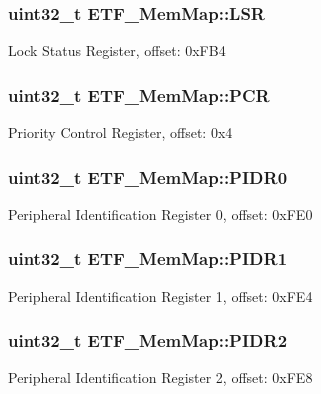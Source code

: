 \subsubsection[{L\+S\+R}]{\setlength{\rightskip}{0pt plus 5cm}uint32\+\_\+t E\+T\+F\+\_\+\+Mem\+Map\+::\+L\+S\+R}\label{struct_e_t_f___mem_map_a404d7b7ce01537cb61bbb7c2d2ec1de5}
Lock Status Register, offset\+: 0x\+F\+B4 \hypertarget{struct_e_t_f___mem_map_aa50938e7ba3b91d0bc8417397ef82267}{}
\subsubsection[{P\+C\+R}]{\setlength{\rightskip}{0pt plus 5cm}uint32\+\_\+t E\+T\+F\+\_\+\+Mem\+Map\+::\+P\+C\+R}\label{struct_e_t_f___mem_map_aa50938e7ba3b91d0bc8417397ef82267}
Priority Control Register, offset\+: 0x4 \hypertarget{struct_e_t_f___mem_map_a0ed9ad5240882ee853a4f4e8871c145f}{}
\subsubsection[{P\+I\+D\+R0}]{\setlength{\rightskip}{0pt plus 5cm}uint32\+\_\+t E\+T\+F\+\_\+\+Mem\+Map\+::\+P\+I\+D\+R0}\label{struct_e_t_f___mem_map_a0ed9ad5240882ee853a4f4e8871c145f}
Peripheral Identification Register 0, offset\+: 0x\+F\+E0 \hypertarget{struct_e_t_f___mem_map_a70c724eb6523bbe1eedd98c71922cf65}{}
\subsubsection[{P\+I\+D\+R1}]{\setlength{\rightskip}{0pt plus 5cm}uint32\+\_\+t E\+T\+F\+\_\+\+Mem\+Map\+::\+P\+I\+D\+R1}\label{struct_e_t_f___mem_map_a70c724eb6523bbe1eedd98c71922cf65}
Peripheral Identification Register 1, offset\+: 0x\+F\+E4 \hypertarget{struct_e_t_f___mem_map_a4b3e618b1219f136bfd2e2846b1c1b1c}{}
\subsubsection[{P\+I\+D\+R2}]{\setlength{\rightskip}{0pt plus 5cm}uint32\+\_\+t E\+T\+F\+\_\+\+Mem\+Map\+::\+P\+I\+D\+R2}\label{struct_e_t_f___mem_map_a4b3e618b1219f136bfd2e2846b1c1b1c}
Peripheral Identification Register 2, offset\+: 0x\+F\+E8 \hypertarget{struct_e_t_f___mem_map_a1132bf279f207a39e89f2fab3d384308}{}
